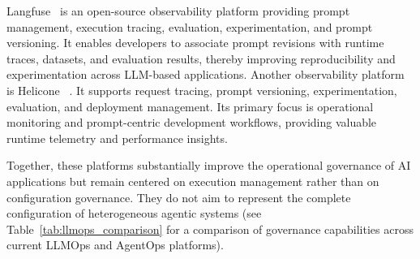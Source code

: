 \documentclass[10pt]{article}
\begin{document}
Langfuse~\cite{langfusedocs} is an open-source observability platform providing prompt management, execution tracing, evaluation, experimentation, and prompt versioning. It enables developers to associate prompt revisions with runtime traces, datasets, and evaluation results, thereby improving reproducibility and
experimentation across LLM-based applications.
Another observability platform is Helicone ~\cite{heliconedocs}. It supports request tracing, prompt versioning, experimentation, evaluation, and deployment management. Its primary focus is operational monitoring and prompt-centric development workflows, providing valuable runtime telemetry and performance insights. 

Together, these platforms substantially improve the operational governance of AI applications but remain centered on execution management rather than on configuration governance. They do not aim to represent the complete configuration of heterogeneous agentic systems (see Table~\ref{tab:llmops_comparison} for a comparison of governance capabilities across current LLMOps and AgentOps platforms).
\end{document}
